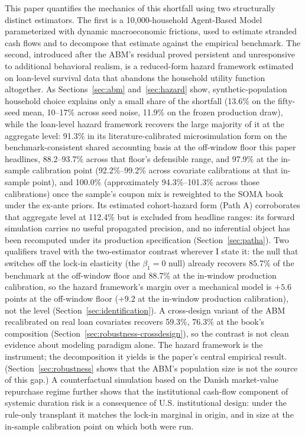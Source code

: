 \documentclass[12pt]{article}
\begin{document}
This paper quantifies the mechanics of this shortfall using two structurally distinct estimators. The first is a 10,000-household Agent-Based Model parameterized with dynamic macroeconomic frictions, used to estimate stranded cash flows and to decompose that estimate against the empirical benchmark. The second, introduced after the ABM's residual proved persistent and unresponsive to additional behavioral realism, is a reduced-form hazard framework estimated on loan-level survival data that abandons the household utility function altogether. As Sections~\ref{sec:abm} and~\ref{sec:hazard} show, synthetic-population household choice explains only a small share of the shortfall (13.6\% on the fifty-seed mean, 10--17\% across seed noise, 11.9\% on the frozen production draw), while the loan-level hazard framework recovers the large majority of it at the aggregate level: 91.3\% in its literature-calibrated microsimulation form on the benchmark-consistent shared accounting basis at the off-window floor this paper headlines, 88.2--93.7\% across that floor's defensible range, and 97.9\% at the in-sample calibration point (92.2\%--99.2\% across covariate calibrations at that in-sample point), and 100.0\% (approximately 94.3\%--101.3\% across those calibrations) once the sample's coupon mix is reweighted to the SOMA book under the ex-ante priors. Its estimated cohort-hazard form (Path A) corroborates that aggregate level at 112.4\% but is excluded from headline ranges: its forward simulation carries no useful propagated precision, and no inferential object has been recomputed under its production specification (Section~\ref{sec:patha}). Two qualifiers travel with the two-estimator contrast wherever I state it: the null that switches off the lock-in elasticity (the $\beta_1 = 0$ null) already recovers 85.7\% of the benchmark at the off-window floor and 88.7\% at the in-window production calibration, so the hazard framework's margin over a mechanical model is $+5.6$ points at the off-window floor ($+9.2$ at the in-window production calibration), not the level (Section~\ref{sec:identification}). A cross-design variant of the ABM recalibrated on real loan covariates recovers 59.3\%, 76.3\% at the book's composition (Section~\ref{sec:robustness-crossdesign}), so the contrast is not clean evidence about modeling paradigm alone. The hazard framework is the instrument; the decomposition it yields is the paper's central empirical result. (Section~\ref{sec:robustness} shows that the ABM's population size is not the source of this gap.) A counterfactual simulation based on the Danish market-value repurchase regime further shows that the institutional cash-flow component of systemic duration risk is a consequence of U.S. institutional design: under the rule-only transplant it matches the lock-in marginal in origin, and in size at the in-sample calibration point on which both were run.
\end{document}
